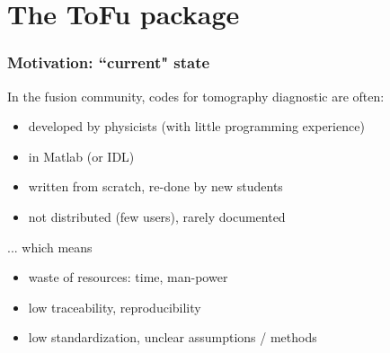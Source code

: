 \documentclass[10pt]{beamer}
\begin{document}
\section{The ToFu package}


\begin{frame}
\frametitle{Motivation: ``current" state}

	In the fusion community, codes for tomography diagnostic are often:
	\begin{itemize}
		\item  developed by physicists (with little programming experience)
		\item  in Matlab (or IDL)
		\item  written from scratch, re-done by new students
		\item  not distributed (few users), rarely documented
	\end{itemize}

... which means
\begin{itemize}
		\item  waste of resources: time, man-power
		\item  low traceability, reproducibility
		\item  low standardization, unclear assumptions / methods
	\end{itemize}

\end{frame}
\end{document}

